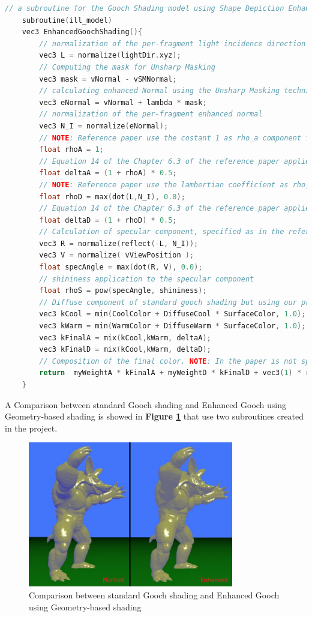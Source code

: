 \begin{lstlisting}[language=C++, caption=Enhanced Gooch shading subroutine implemented in fragment shader,label={code:gooch-enhanced}]
	// a subroutine for the Gooch Shading model using Shape Depiction Enhancement based on local Geometry 
	subroutine(ill_model)
	vec3 EnhancedGoochShading(){
		// normalization of the per-fragment light incidence direction
		vec3 L = normalize(lightDir.xyz);
		// Computing the mask for Unsharp Masking
		vec3 mask = vNormal - vSMNormal;
		// calculating enhanced Normal using the Unsharp Masking technique. This is defined, in the reference paper, in equation 6 of chapter 4.2.2
		vec3 eNormal = vNormal + lambda * mask;
		// normalization of the per-fragment enhanced normal 
		vec3 N_I = normalize(eNormal);
		// NOTE: Reference paper use the costant 1 as rho_a component for ambient
		float rhoA = 1;
		// Equation 14 of the Chapter 6.3 of the reference paper applied only to diffuse and ambient components 
		float deltaA = (1 + rhoA) * 0.5;
		// NOTE: Reference paper use the lambertian coefficient as rho_d for diffuse
		float rhoD = max(dot(L,N_I), 0.0);
		// Equation 14 of the Chapter 6.3 of the reference paper applied only to diffuse and ambient components 
		float deltaD = (1 + rhoD) * 0.5;
		// Calculation of specular component, specified as in the reference paper, using the same as Phong model
		vec3 R = normalize(reflect(-L, N_I));
		vec3 V = normalize( vViewPosition );
		float specAngle = max(dot(R, V), 0.0);
		// shininess application to the specular component
		float rhoS = pow(specAngle, shininess);
		// Diffuse component of standard gooch shading but using our previously calculated delta as weight, for diffuse and ambient component
		vec3 kCool = min(CoolColor + DiffuseCool * SurfaceColor, 1.0);
		vec3 kWarm = min(WarmColor + DiffuseWarm * SurfaceColor, 1.0);
		vec3 kFinalA = mix(kCool,kWarm, deltaA);
		vec3 kFinalD = mix(kCool,kWarm, deltaD);
		// Composition of the final color. NOTE: In the paper is not specified how the three components are composed. This is my solution that considers only Ambient and Diffuse components, while maintaning full specular component
		return  myWeightA * kFinalA + myWeightD * kFinalD + vec3(1) * rhoS;
	}
\end{lstlisting}
A Comparison between standard Gooch shading and Enhanced Gooch using Geometry-based shading is showed in \textbf{Figure \ref{fig:gooch_comparison}} that use two subroutines created in the project.
\begin{figure}[h]
	\centering
	\includegraphics[width=0.8\textwidth]{Images/gooch_comparison.png}
	\caption{Comparison between standard Gooch shading and Enhanced Gooch using Geometry-based shading}
	\label{fig:gooch_comparison}
\end{figure}

